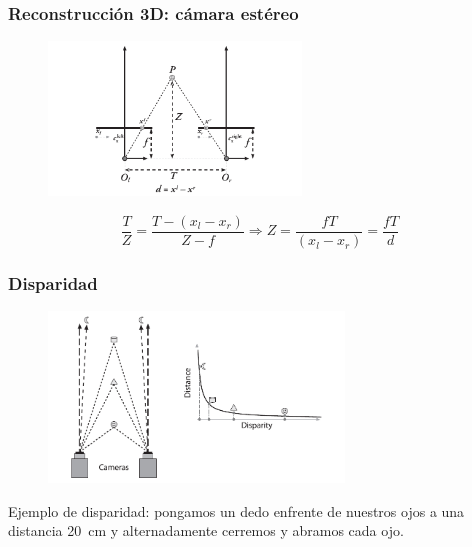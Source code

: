 \begin{frame}
	\frametitle{Reconstrucción 3D: cámara estéreo}
	
	
	\begin{figure}[!h]
		\includegraphics[width=0.6\textwidth]{images/stereo_triangulation2.png}
	\end{figure}
	
	\begin{equation*}
		\frac{T}{Z} = \frac{T - (x_l - x_r)}{Z-f} \Rightarrow Z = \frac{fT}{(x_l - x_r)}  = \frac{fT}{d}
	\end{equation*}
	
\end{frame}

\begin{frame}
	\frametitle{Disparidad}
	\footnotesize
	\begin{figure}[!h]
		\includegraphics[width=0.7\textwidth]{images/disparity.png}
	\end{figure}

    Ejemplo de disparidad: pongamos un dedo enfrente de nuestros ojos a una distancia \SI{20}{\centi\meter} y alternadamente cerremos y abramos cada ojo.

\end{frame}


